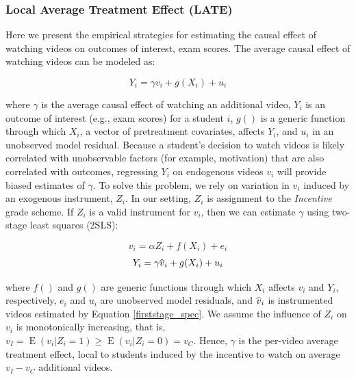 \documentclass[12pt]{article}
\newcommand\wh[1]{\hstretch{2}{\hat{\hstretch{.5}{#1}}}}
\begin{document}
\subsubsection{Local Average Treatment Effect (LATE)}

Here we present the empirical strategies for estimating the causal effect of watching videos on outcomes of interest, exam scores. The average causal effect of watching videos can be modeled as:

\begin{equation} \label{endog_spec}
	Y_i = \gamma v_i + g(X_i) + u_i
\end{equation}

where $\gamma$ is the average causal effect of watching an additional video, $Y_i$ is an outcome of interest (e.g., exam scores) for a student $i$, $g()$ is a generic function through which $X_i$, a vector of pretreatment covariates, affects $Y_i$, and $u_i$ in an unobserved model residual. Because a student's decision to watch videos is likely correlated with unobservable factors (for example, motivation) that are also correlated with outcomes, regressing $Y_i$ on endogenous videos $v_i$ will provide biased estimates of $\gamma$. To solve this problem, we rely on variation in $v_i$ induced by an exogenous instrument, $Z_i$. In our setting, $Z_i$ is assignment to the \textit{Incentive} grade scheme. If $Z_i$ is a valid instrument for $v_i$, then we can estimate $\gamma$ using two-stage least squares (2SLS):

\begin{equation} \label{firststage_spec}
	v_i = \alpha Z_i + f(X_i) + e_i
\end{equation}
\begin{equation} \label{secondstage_spec}
	Y_i = \gamma \wh{v}_i + g(X_i) + u_i
\end{equation}

where $f()$ and $g()$ are generic functions through which $X_i$ affects $v_i$ and $Y_i$, respectively, $e_i$ and $u_i$ are unobserved model residuals, and $\wh{v}_i$ is instrumented videos estimated by Equation \ref{firststage_spec}. We assume the influence of $Z_i$ on $v_i$ is monotonically increasing, that is, $v_I = \operatorname{E}(v_i|Z_i=1) \geq \operatorname{E}(v_i|Z_i=0) = v_C$. Hence, $\gamma$ is the per-video average treatment effect, local to students induced by the incentive to watch on average $v_I - v_C$ additional videos.  

 
\end{document}
